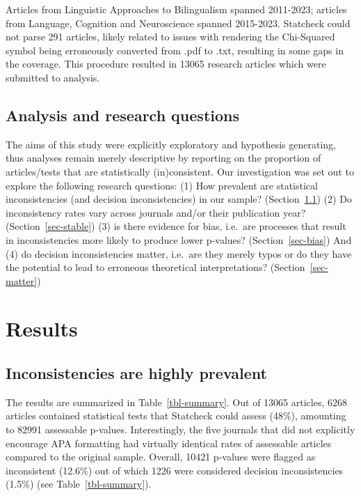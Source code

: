 \documentclass[
  doc,
  longtable,
  nolmodern,
  notxfonts,
  notimes,
  colorlinks=true,linkcolor=blue,citecolor=blue,urlcolor=blue]{apa7}
\begin{document}
Articles from Linguistic Approaches to Bilingualism spanned 2011-2023;
articles from Language, Cognition and Neuroscience spanned 2015-2023.
Statcheck could not parse 291 articles, likely related to issues with
rendering the Chi-Squared symbol being erroneously converted from .pdf
to .txt, resulting in some gaps in the coverage. This procedure resulted
in 13065 research articles which were submitted to analysis.

\subsection{Analysis and research
questions}\label{analysis-and-research-questions}

The aims of this study were explicitly exploratory and hypothesis
generating, thus analyses remain merely descriptive by reporting on the
proportion of articles/tests that are statistically (in)consistent. Our
investigation was set out to explore the following research questions:
(1) How prevalent are statistical inconsistencies (and decision
inconsistencies) in our sample? (Section~\ref{sec-prevalent}) (2) Do
inconsistency rates vary across journals and/or their publication year?
(Section~\ref{sec-stable}) (3) is there evidence for bias, i.e.~are
processes that result in inconsistencies more likely to produce lower
p-values? (Section~\ref{sec-bias}) And (4) do decision inconsistencies
matter, i.e.~are they merely typos or do they have the potential to lead
to erroneous theoretical interpretations? (Section~\ref{sec-matter})

\section{Results}\label{results}

\subsection{Inconsistencies are highly prevalent}\label{sec-prevalent}

The results are summarized in Table~\ref{tbl-summary}. Out of 13065
articles, 6268 articles contained statistical tests that Statcheck could
assess (48\%), amounting to 82991 assessable p-values. Interestingly,
the five journals that did not explicitly encourage APA formatting had
virtually identical rates of assessable articles compared to the
original sample. Overall, 10421 p-values were flagged as inconsistent
(12.6\%) out of which 1226 were considered decision inconsistencies
(1.5\%) (see Table~\ref{tbl-summary}).
\end{document}
